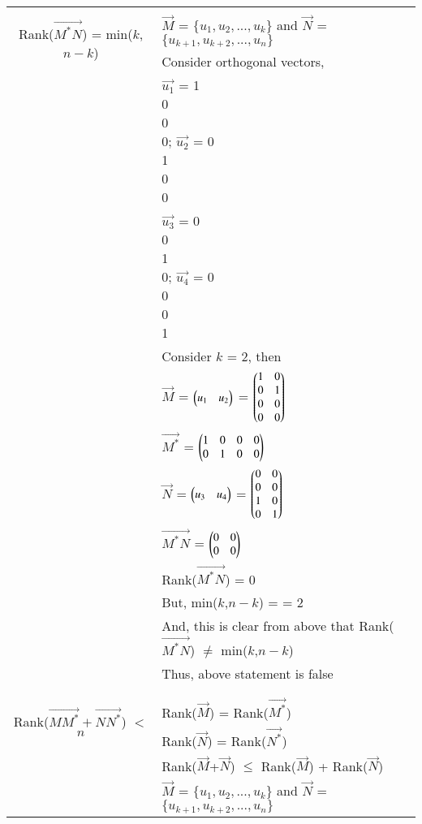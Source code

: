\begin{longtable}{|c|l|}
	\hline
	\multirow{3}{*}{Rank($\vec{{M}^*N}$) = min($k$,$n-k$)} 
	& \\
	& $\vec{M}$ = $\{u_1,u_2,...,u_k\}$ and $\vec{N}$ = $\{u_{k+1},u_{k+2},...,u_n\}$ \\
	& Consider orthogonal vectors,\\
	& $\vec{u_1}$ = \myvec{1\\0\\0\\0}; $\vec{u_2}$ = \myvec{0\\1\\0\\0}\\
	& $\vec{u_3}$ = \myvec{0\\0\\1\\0}; $\vec{u_4}$ = \myvec{0\\0\\0\\1}\\
	& Consider $k$ = 2, then \\
	& $\vec{M}$ = $\begin{pmatrix}u_1&u_2\end{pmatrix}$ = $\begin{pmatrix}1&0\\0&1\\0&0\\0&0\end{pmatrix}$\\
	& $\vec{M^*}$ = $\begin{pmatrix}1&0&0&0\\0&1&0&0\end{pmatrix}$\\
	& $\vec{N}$ = $\begin{pmatrix}u_3&u_4\end{pmatrix}$ = $\begin{pmatrix}0&0\\0&0\\1&0\\0&1\end{pmatrix}$\\
	& $\vec{M^*N}$ = $\begin{pmatrix}0&0\\0&0\end{pmatrix}$\\
	& Rank($\vec{M^*N}$) = 0\\
	& But, min($k$,$n-k$) = \brak{2,2} = 2 \\
	& And, this is clear from above that Rank($\vec{{M}^*N}$) $\ne$ min($k$,$n-k$)\\
	& Thus, above statement is false \\
	&\\
	\hline
	\multirow{3}{*}{Rank($\vec{M{M}^*}+\vec{N{N}^*}$) $<$ $n$} 
	& \\
	& Rank($\vec{M}$) = Rank($\vec{M^*}$)\\
	& Rank($\vec{N}$) = Rank($\vec{N^*}$)\\
	& Rank($\vec{M}$+$\vec{N}$) $\le$ Rank($\vec{M}$) + Rank($\vec{N}$)\\
	& $\vec{M}$ = $\{u_1,u_2,...,u_k\}$ and $\vec{N}$ = $\{u_{k+1},u_{k+2},...,u_n\}$ \\

\end{longtable}
